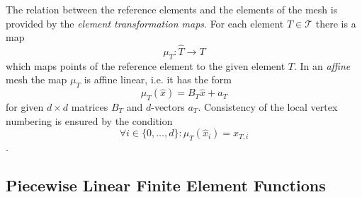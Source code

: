 \documentclass[a4paper,
		     11pt,
		     DIV12,
		     DIVcalc,
		     headings=normal,
		     oneside,
		     bibliography=totoc,
		     headsepline=false,
		     headinclude]{scrartcl}
\begin{document}
The relation between the reference elements and the elements of the mesh
is provided by the {\em element transformation maps}.
For each element $T\in\mathcal{T}$ there is a map
$$\mu_T : \hat T \to T$$ which maps points of the reference element to the
given element $T$. In an {\em affine} mesh the map $\mu_T$ is affine linear, i.e. it
has the form 
\begin{equation*}
\mu_T(\hat x) = B_T \hat x + a_T
\end{equation*}
for given $d\times d$ matrices $B_T$ and $d$-vectors $a_T$.
Consistency of the local vertex numbering is ensured by the condition
$$\forall i\in\{0,\ldots,d\} : \mu_T(\hat x_i) = x_{T,i}$$.

\subsection{Piecewise Linear Finite Element Functions}
\end{document}

